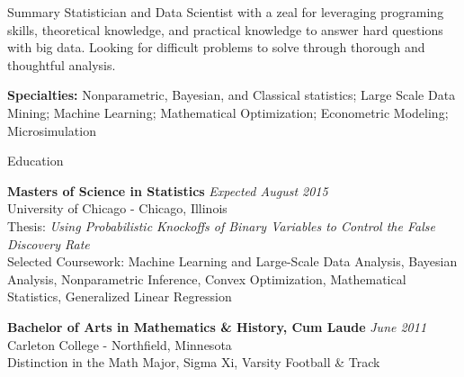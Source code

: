 \documentclass{resume} %
\begin{document}

\begin{rSection}{Summary}
Statistician and Data Scientist with a zeal for leveraging programing skills, theoretical knowledge, and practical knowledge to answer hard questions with big data. Looking for difficult problems to solve through thorough and thoughtful analysis.

{\bf Specialties:} Nonparametric, Bayesian, and Classical statistics; Large Scale Data Mining; Machine Learning; Mathematical Optimization; Econometric Modeling; Microsimulation
\end{rSection}



\begin{rSection}{Education}

    {\bf Masters of Science in Statistics} \hfill {\em Expected August 2015} \\
    University of Chicago - Chicago, Illinois \\
    Thesis: {\em Using Probabilistic Knockoffs of Binary Variables to Control the False Discovery Rate} \\
    Selected Coursework: Machine Learning and Large-Scale Data Analysis, Bayesian Analysis, Nonparametric Inference, Convex Optimization, Mathematical Statistics, Generalized Linear Regression


    {\bf Bachelor of Arts in Mathematics \& History, Cum Laude} \hfill {\em June 2011} \\ 
    Carleton College - Northfield, Minnesota  \\
    Distinction in the Math Major, Sigma Xi, Varsity Football \& Track
\end{rSection}

\end{document}
